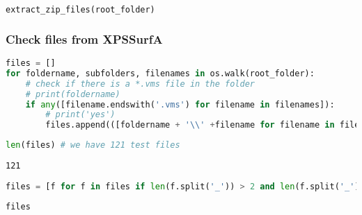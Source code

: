 \begin{lstlisting}[language=Python]
extract_zip_files(root_folder)
\end{lstlisting}

\subsubsection*{Check files from XPSSurfA}\label{check-files-from-xpssurfa}

\begin{lstlisting}[language=Python]
files = []
for foldername, subfolders, filenames in os.walk(root_folder):
    # check if there is a *.vms file in the folder
    # print(foldername)
    if any([filename.endswith('.vms') for filename in filenames]):
        # print('yes')
        files.append(([foldername + '\\' +filename for filename in filenames if filename.endswith('.vms')][0]))
\end{lstlisting}

\begin{lstlisting}[language=Python]
len(files) # we have 121 test files
\end{lstlisting}

\begin{lstlisting}
121
\end{lstlisting}

\begin{lstlisting}[language=Python]
files = [f for f in files if len(f.split('_')) > 2 and len(f.split('_')[-1]) < 15 and not 'Cali' in f]
\end{lstlisting}

\begin{lstlisting}[language=Python]
files
\end{lstlisting}

